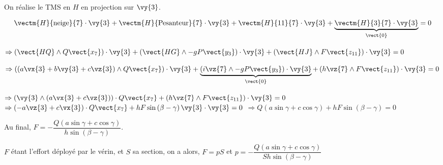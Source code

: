 On réalise le TMS en $H$ en projection sur $\vy{3}$.

$$
\vectm{H}{\text{neige}}{7} \cdot \vy{3} + \vectm{H}{\text{Pesanteur}}{7} \cdot \vy{3} + \vectm{H}{11}{7} \cdot \vy{3} + \underbrace{\vectm{H}{3}{7} \cdot \vy{3}}_{\vect{0}} =0
$$

$
\Rightarrow
\left(\vect{HQ}\wedge Q\vect{x_7} \right) \cdot \vy{3} 
+ \left(\vect{HG}\wedge -gP\vect{y_3} \right) \cdot \vy{3} 
+ \left(\vect{HJ}\wedge F\vect{z_{11}} \right)  \cdot \vy{3}=0
$

$
\Rightarrow
\left(\left(a\vx{3}+b\vy{3}+c\vz{3}\right)\wedge Q\vect{x_7} \right) \cdot \vy{3} 
+ \underbrace{\left( i\vz{7}\wedge -gP\vect{y_3} \right) \cdot \vy{3}}_{\vect{0}}
+ \left(h\vz{7}\wedge F\vect{z_{11}} \right)  \cdot \vy{3}=0
$

$
\Rightarrow
\left(\vy{3} \wedge \left(a\vx{3}+c\vz{3}\right)  \right) \cdot   Q\vect{x_7}
+ \left(h\vz{7}\wedge F\vect{z_{11}} \right)  \cdot \vy{3}=0
$
$
\Rightarrow
\left( -a\vz{3}+c\vx{3}\right)   \cdot   Q\vect{x_7}
+ hF \sin\left(\beta - \gamma\right)\vy{3}  \cdot \vy{3}=0
$
$
\Rightarrow
Q\left( a\sin \gamma+c\cos\gamma \right)  
+ hF \sin\left(\beta - \gamma\right)=0
$

Au final, $F= - \dfrac{Q\left( a\sin \gamma+c\cos\gamma \right)  }{ h \sin\left(\beta - \gamma\right)}$.

$F$ étant l'effort déployé par le vérin, et $S$ sa section, on a alors, $F=pS$ et 
$p= - \dfrac{Q\left( a\sin \gamma+c\cos\gamma \right)  }{S h \sin\left(\beta - \gamma\right)}$
